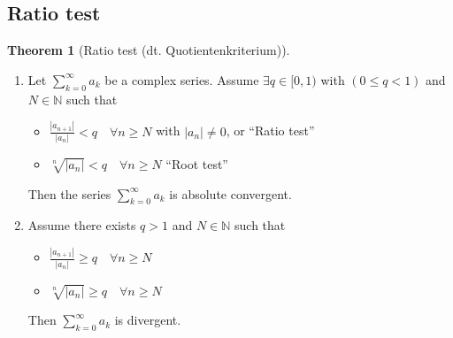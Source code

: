 \documentclass[a4paper,landscape,twocolumn]{article}
\theoremstyle{definition}
\newtheorem{theorem}{Theorem}
\newcommand\abs[1]{\left|#1\right|}
\begin{document}
\subsection{Ratio test}
\begin{theorem}[Ratio test (dt. \foreignlanguage{ngerman}{Quotientenkriterium})]
  \begin{enumerate}
    \item
      Let $\sum_{k=0}^\infty a_k$ be a complex series.
      Assume $\exists q \in [0, 1)$ with $(0 \leq q < 1)$ and $N \in \mathbb N$ such that
      \begin{itemize}
        \item $\frac{\abs{a_{n+1}}}{\abs{a_n}} < q \quad \forall n \geq N$ with $\abs{a_n} \neq 0$, or
          \hfill{} \enquote{Ratio test}
        \item $\sqrt[n]{\abs{a_n}} < q \quad \forall n \geq N$
          \hfill{}  \enquote{Root test}
      \end{itemize}
      Then the series $\sum_{k=0}^\infty a_k$ is absolute convergent.
    \item
      Assume there exists $q > 1$ and $N \in \mathbb N$ such that
      \begin{itemize}
        \item $\frac{\abs{a_{n+1}}}{\abs{a_n}} \geq q \quad \forall n \geq N$
        \item $\sqrt[n]{\abs{a_n}} \geq q \quad \forall n \geq N$
      \end{itemize}
      Then $\sum_{k=0}^\infty a_k$ is divergent.
  \end{enumerate}
\end{theorem}
\end{document}
